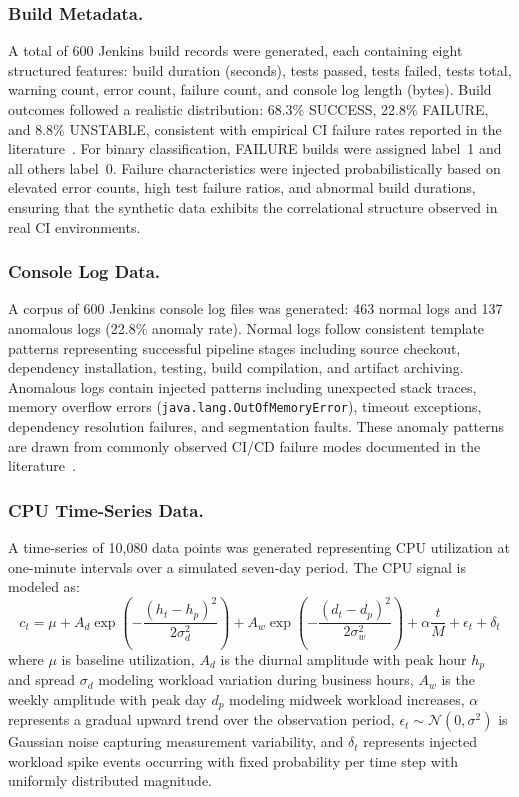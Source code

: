 \documentclass[sn-nature]{sn-jnl}
\theoremstyle{thmstyleone}
\theoremstyle{thmstyletwo}
\theoremstyle{thmstylethree}
\begin{document}
\subsubsection{Build Metadata.}
A total of 600 Jenkins build records were generated, each containing eight structured features: build duration (seconds), tests passed, tests failed, tests total, warning count, error count, failure count, and console log length (bytes). Build outcomes followed a realistic distribution: 68.3\% SUCCESS, 22.8\% FAILURE, and 8.8\% UNSTABLE, consistent with empirical CI failure rates reported in the literature~\cite{rausch2017empirical}. For binary classification, FAILURE builds were assigned label~1 and all others label~0. Failure characteristics were injected probabilistically based on elevated error counts, high test failure ratios, and abnormal build durations, ensuring that the synthetic data exhibits the correlational structure observed in real CI environments.

\subsubsection{Console Log Data.}
A corpus of 600 Jenkins console log files was generated: 463 normal logs and 137 anomalous logs (22.8\% anomaly rate). Normal logs follow consistent template patterns representing successful pipeline stages including source checkout, dependency installation, testing, build compilation, and artifact archiving. Anomalous logs contain injected patterns including unexpected stack traces, memory overflow errors (\texttt{java.lang.OutOfMemoryError}), timeout exceptions, dependency resolution failures, and segmentation faults. These anomaly patterns are drawn from commonly observed CI/CD failure modes documented in the literature~\cite{he2016experience, xu2009logmining}.

\subsubsection{CPU Time-Series Data.}
A time-series of 10,080 data points was generated representing CPU utilization at one-minute intervals over a simulated seven-day period. The CPU signal is modeled as:
\begin{equation}\label{eq:cpusignal}
c_t = \mu + A_d \exp\!\left(-\frac{(h_t - h_p)^2}{2\sigma_d^2}\right) + A_w \exp\!\left(-\frac{(d_t - d_p)^2}{2\sigma_w^2}\right) + \alpha \frac{t}{M} + \epsilon_t + \delta_t
\end{equation}
where $\mu$ is baseline utilization, $A_d$ is the diurnal amplitude with peak hour $h_p$ and spread $\sigma_d$ modeling workload variation during business hours, $A_w$ is the weekly amplitude with peak day $d_p$ modeling midweek workload increases, $\alpha$ represents a gradual upward trend over the observation period, $\epsilon_t \sim \mathcal{N}(0, \sigma^2)$ is Gaussian noise capturing measurement variability, and $\delta_t$ represents injected workload spike events occurring with fixed probability per time step with uniformly distributed magnitude.
\end{document}
